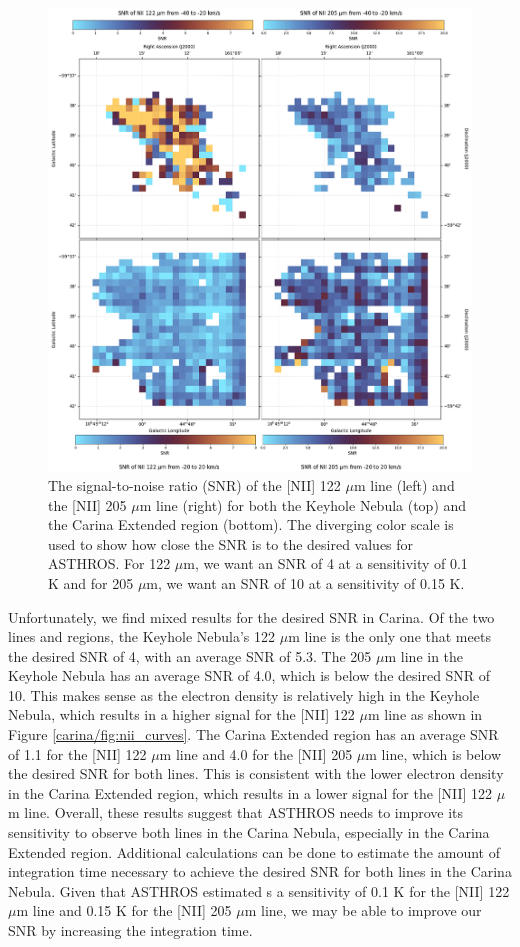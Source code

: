 \begin{figure}
    \centering
    \includegraphics[width=.9\textwidth]{figs/carina/snr.png}
    \caption[SNR of the {[}NII{]} 122 $\mu$m and 205 $\mu$m Lines in Carina Nebula]{
        The signal-to-noise ratio (SNR) of the [NII] 122 $\mu$m line (left) and the [NII] 205 $\mu$m line (right) for both the Keyhole Nebula (top) and the Carina Extended region (bottom).
        The diverging color scale is used to show how close the SNR is to the desired values for ASTHROS.
        For 122 $\mu$m, we want an SNR of 4 at a sensitivity of 0.1 K and for 205 $\mu$m, we want an SNR of 10 at a sensitivity of 0.15 K.
        }
    \label{carina/fig:snr}
\end{figure}

Unfortunately, we find mixed results for the desired SNR in Carina. 
Of the two lines and regions, the Keyhole Nebula's 122 $\mu$m line is the only one that meets the desired SNR of 4, with an average SNR of 5.3.
The 205 $\mu$m line in the Keyhole Nebula has an average SNR of 4.0, which is below the desired SNR of 10.
This makes sense as the electron density is relatively high in the Keyhole Nebula, which results in a higher signal for the [NII] 122 $\mu$m line as shown in Figure \ref{carina/fig:nii_curves}.
The Carina Extended region has an average SNR of 1.1 for the [NII] 122 $\mu$m line and 4.0 for the [NII] 205 $\mu$m line, which is below the desired SNR for both lines.
This is consistent with the lower electron density in the Carina Extended region, which results in a lower signal for the [NII] 122 $\mu$m line.
Overall, these results suggest that ASTHROS needs to improve its sensitivity to observe both lines in the Carina Nebula, especially in the Carina Extended region.
Additional calculations can be done to estimate the amount of integration time necessary to achieve the desired SNR for both lines in the Carina Nebula.
Given that ASTHROS estimated s a sensitivity of 0.1 K for the [NII] 122 $\mu$m line and 0.15 K for the [NII] 205 $\mu$m line, we may be able to improve our SNR by increasing the integration time.